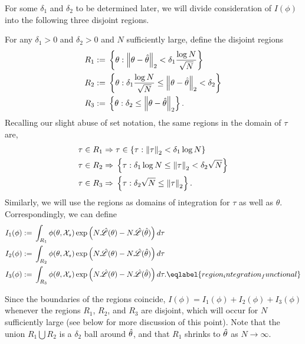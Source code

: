 For some $\delta_1$ and $\delta_2$ to be determined later, we will divide
consideration of $I(\phi)$ into the following three disjoint regions.

\begin{defn}
%
For any $\delta_1 > 0$ and $\delta_2 > 0$ and $N$ sufficiently large, define
the disjoint regions
%
\begin{align*}
R_1 :={}& \left\{\theta:
    \left\Vert \theta - \hat\theta\right\Vert_2 < \delta_1 \frac{\log N}{\sqrt{N}} \right\}\\
R_2 :={}& \left\{\theta:
    \delta_1 \frac{\log N}{\sqrt{N}} \le
        \left\Vert \theta - \hat\theta\right\Vert_2 < \delta_2 \right\} \\
R_3 :={}& \left\{\theta:
    \delta_2 \le \left\Vert \theta - \hat\theta\right\Vert_2  \right\}.
\end{align*}
%
Recalling our slight abuse of set notation, the same regions in the domain of $\tau$
are,
%
\begin{align*}
\tau \in R_1 \Rightarrow{}& \tau \in \left\{\tau:
    \left\Vert \tau\right\Vert_2 < \delta_1 \log N \right\}\\
\tau \in R_2 \Rightarrow{}& \left\{\tau:
    \delta_1 \log N \le
        \left\Vert \tau\right\Vert_2 < \delta_2 \sqrt{N} \right\} \\
\tau \in R_3 \Rightarrow{}& \left\{\tau:
    \delta_2 \sqrt{N} \le \left\Vert \tau\right\Vert_2  \right\}.
\end{align*}
%
Similarly, we will use the regions as domains of integration for $\tau$ as well
as $\theta$. Correspondingly, we can define
%
\begin{align}
I_1(\phi) :={}& \int_{R_1} \phi(\theta, \xvec_s)
   \exp\left(N \likhat(\theta) - N \likhat(\thetahat)\right) d \tau \nonumber\\
I_2(\phi) :={}& \int_{R_2} \phi(\theta, \xvec_s)
  \exp\left(N \likhat(\theta) - N \likhat(\thetahat)\right) d \tau \nonumber\\
I_3(\phi) :={}& \int_{R_3} \phi(\theta, \xvec_s)
 \exp\left(N \likhat(\theta) - N \likhat(\thetahat)\right) d \tau.
 \eqlabel{region_integration_functional}
\end{align}
%
\end{defn}
%
Since the boundaries of the regions coincide, $I(\phi) = I_1(\phi) + I_2(\phi) +
I_3(\phi)$ whenever the regions $R_1$, $R_2$, and $R_3$ are disjoint, which
will occur for $N$ sufficiently large (see  below for more
discussion of this point). Note that the union $R_1 \bigcup R_2$ is a $\delta_2$
ball around $\hat\theta$, and that $R_1$ shrinks to $\hat\theta$ as $N \rightarrow
\infty$.

